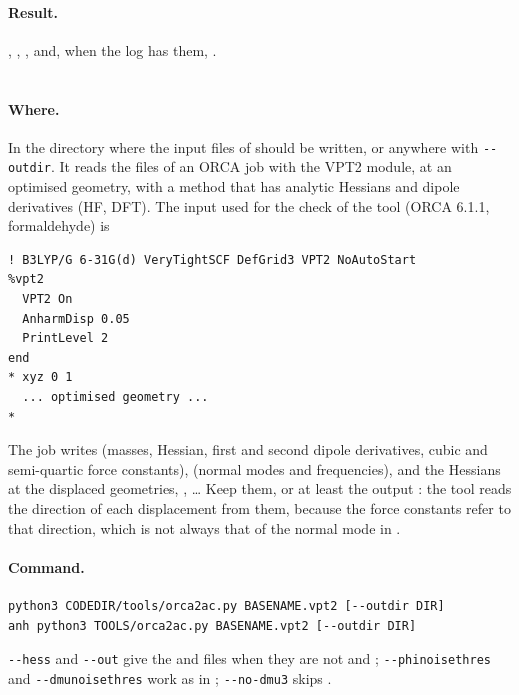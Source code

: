 \paragraph{Result.} , , ,
 and, when the log has them, .

\section{}\label{sec:run-orca2ac}

\paragraph{Where.} In the directory where the input files of \ac{} should
be written, or anywhere with \texttt{-{}-outdir}. It reads the files of an
ORCA job with the VPT2 module, at an optimised geometry, with a method
that has analytic Hessians and dipole derivatives (HF, DFT). The input
used for the check of the tool (ORCA 6.1.1, formaldehyde) is
\begin{lstlisting}
! B3LYP/G 6-31G(d) VeryTightSCF DefGrid3 VPT2 NoAutoStart
%vpt2
  VPT2 On
  AnharmDisp 0.05
  PrintLevel 2
end
* xyz 0 1
  ... optimised geometry ...
*
\end{lstlisting}
The job  writes  (masses, Hessian,
first and second dipole derivatives, cubic and semi-quartic force
constants),  (normal modes and frequencies), and the
Hessians at the displaced geometries, ,
\ldots{} Keep them, or at least the output : the tool
reads the direction of each displacement from them, because the force
constants refer to that direction, which is not always that of the
normal mode in .

\paragraph{Command.}
\begin{lstlisting}
python3 CODEDIR/tools/orca2ac.py BASENAME.vpt2 [--outdir DIR]
anh python3 TOOLS/orca2ac.py BASENAME.vpt2 [--outdir DIR]
\end{lstlisting}
\texttt{-{}-hess} and \texttt{-{}-out} give the  and
 files when they are not  and
; \texttt{-{}-phinoisethres} and
\texttt{-{}-dmunoisethres} work as in ;
\texttt{-{}-no-dmu3} skips .

